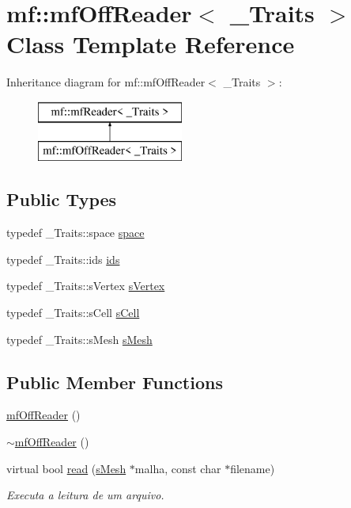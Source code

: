 \hypertarget{classmf_1_1mfOffReader}{
\section{mf::mfOffReader$<$ \_\-Traits $>$ Class Template Reference}
\label{classmf_1_1mfOffReader}
}
Inheritance diagram for mf::mfOffReader$<$ \_\-Traits $>$:\begin{figure}[H]
\begin{center}
\leavevmode
\includegraphics[height=2.000000cm]{classmf_1_1mfOffReader}
\end{center}
\end{figure}
\subsection*{Public Types}
\begin{DoxyCompactItemize}
\item 
typedef \_\-Traits::space \hyperlink{classmf_1_1mfOffReader_ae3a6fa305c9fb47086d819e17a3421d8}{space}
\item 
typedef \_\-Traits::ids \hyperlink{classmf_1_1mfOffReader_abf40a3c998a5b7d45823648315b58d43}{ids}
\item 
typedef \_\-Traits::sVertex \hyperlink{classmf_1_1mfOffReader_a8ecb5f2a5e52408170283b153baff6e1}{sVertex}
\item 
typedef \_\-Traits::sCell \hyperlink{classmf_1_1mfOffReader_acfcb33f834c6ea583daca10ff85c6297}{sCell}
\item 
typedef \_\-Traits::sMesh \hyperlink{classmf_1_1mfOffReader_afd368bca3db54cfe1e60c4a935e6429f}{sMesh}
\end{DoxyCompactItemize}
\subsection*{Public Member Functions}
\begin{DoxyCompactItemize}
\item 
\hyperlink{classmf_1_1mfOffReader_a0df08691ca02b7680795a2c1d188731c}{mfOffReader} ()
\item 
\hyperlink{classmf_1_1mfOffReader_abfef545e8a35d99405608369ba871dfa}{$\sim$mfOffReader} ()
\item 
virtual bool \hyperlink{classmf_1_1mfOffReader_a40cf7f39c327b60827a5858dd3ec8ec9}{read} (\hyperlink{classmf_1_1mfOffReader_afd368bca3db54cfe1e60c4a935e6429f}{sMesh} $\ast$malha, const char $\ast$filename)
\begin{DoxyCompactList}\small\item\em Executa a leitura de um arquivo. \item\end{DoxyCompactList}\end{DoxyCompactItemize}
